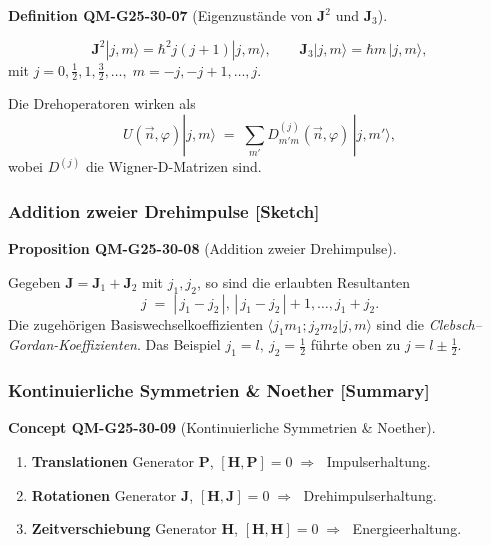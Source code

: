 \documentclass[10pt, letterpaper]{article}
\newcommand{\CustomHeading}[3]{%
  \par\medskip\noindent%
  \textbf{#1 #2} \textnormal{(#3)}.\enskip%
}
\newenvironment{DEF}[2]{\begin{unitbox}\CustomHeading{Definition}{#1}{#2}}{\end{unitbox}}
\newenvironment{PROP}[2]{\begin{unitbox}\CustomHeading{Proposition}{#1}{#2}}{\end{unitbox}}
\newenvironment{CONC}[2]{\begin{unitbox}\CustomHeading{Concept}{#1}{#2}}{\end{unitbox}}
\begin{document}
\begin{DEF}{QM-G25-30-07}{Eigenzustände von $\mathbf J^2$ und $\mathbf J_3$}
\[
  \mathbf J^2|j,m\rangle=\hbar^2 j(j{+}1)|j,m\rangle,
  \qquad
  \mathbf J_3|j,m\rangle=\hbar m\,|j,m\rangle,
\]
mit
\(
  j=0,\tfrac12,1,\tfrac32,\ldots,
  \;
  m=-j,-j{+}1,\ldots,j.
\)

Die Drehoperatoren wirken als
\[
  U(\vec n,\varphi)|j,m\rangle
  \;=\;
  \sum_{m'}D^{(j)}_{m'm}(\vec n,\varphi)\,|j,m'\rangle ,
\]
wobei $D^{(j)}$ die Wigner-D-Matrizen sind.
\end{DEF}


\subsubsection*{Addition zweier Drehimpulse [Sketch]}


\begin{PROP}{QM-G25-30-08}{Addition zweier Drehimpulse}
Gegeben $\mathbf J=\mathbf J_1+\mathbf J_2$ mit
$j_1,j_2$,
so sind die erlaubten Resultanten
\[
  j \;=\; |\,j_1-j_2\,|,\,
  |\,j_1-j_2\,|{+}1,\ldots,j_1+j_2 .
\]
Die zugehörigen Basiswechselkoeffizienten
$\langle j_1m_1;j_2m_2|j,m\rangle$
sind die \emph{Clebsch–Gordan-Koeffizienten}.
Das Beispiel $j_1=l,\ j_2=\tfrac12$ führte oben zu
$j=l\pm\tfrac12$.
\end{PROP}


\subsubsection*{Kontinuierliche Symmetrien \& Noether [Summary]}


\begin{CONC}{QM-G25-30-09}{Kontinuierliche Symmetrien \& Noether}
\begin{enumerate}
  \item \textbf{Translationen}  
        Generator $\mathbf P$,
        $[\mathbf H,\mathbf P]=0 \;\Longrightarrow\;$ Impulserhaltung.
  \item \textbf{Rotationen}  
        Generator $\mathbf J$,
        $[\mathbf H,\mathbf J]=0 \;\Longrightarrow\;$ Drehimpulserhaltung.
  \item \textbf{Zeitverschiebung}  
        Generator $\mathbf H$,
        $[\mathbf H,\mathbf H]=0 \;\Longrightarrow\;$ Energieerhaltung.
\end{enumerate}
\end{CONC}
\end{document}
